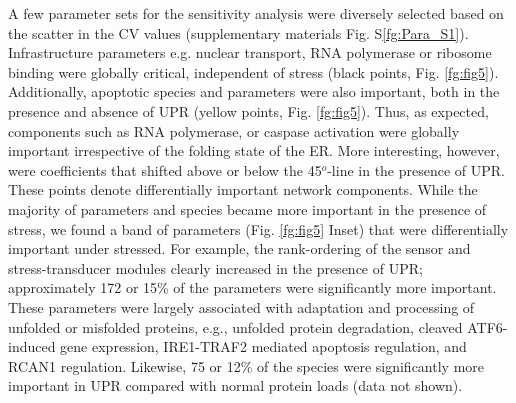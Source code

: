 \documentclass[12pt]{article}
\begin{document}
A few parameter sets for the sensitivity analysis were diversely selected based on the scatter in the CV values (supplementary materials Fig. S\ref{fg:Para_S1}). Infrastructure parameters e.g. nuclear transport, RNA polymerase or ribosome binding were globally critical, independent of stress (black points, Fig. \ref{fg:fig5}). Additionally, apoptotic species and parameters were also important, both in the presence and absence of UPR (yellow points, Fig. \ref{fg:fig5}). Thus, as expected, components such as RNA polymerase, or caspase activation were globally important irrespective of the folding state of the ER. More interesting, however, were coefficients that shifted above or below the 45$^{o}$-line in the presence of UPR. These points denote differentially important network components. While the majority of parameters and species became more important in the presence of stress, we found a band of parameters (Fig. \ref{fg:fig5} Inset) that were differentially important under stressed. For example, the rank-ordering of the sensor and stress-transducer modules clearly increased in the presence of UPR; approximately 172 or 15\% of the parameters were significantly more important. These parameters were largely associated with adaptation and processing of unfolded or misfolded proteins, e.g., unfolded protein degradation, cleaved ATF6-induced gene expression, IRE1-TRAF2 mediated apoptosis regulation, and RCAN1 regulation. Likewise, 75 or 12\% of the species were significantly more important in UPR compared with normal protein loads (data not shown).
\end{document}
